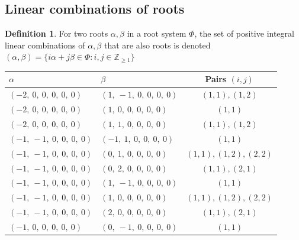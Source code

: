 \documentclass[11pt]{article}
\theoremstyle{definition}
\newtheorem{definition}{Definition}[section]
\begin{document}
\subsection{Linear combinations of roots}

\begin{definition}
For two roots $\alpha, \beta$ in a root system $\Phi$, the set of positive integral linear combinations of $\alpha, \beta$ that are also roots is denoted
\(
	(\alpha, \beta) = \{ i \alpha + j \beta \in \Phi : i, j \in \mathbb{Z}_{\ge 1} \}
\)
\end{definition}

\begin{center}
\begin{tabular}{|l|l|c|}
    \hline
    $\alpha$ & $\beta$ & Pairs $(i,j)$ \\
    \hline
    $\left( -2, \  0, \  0, \  0, \  0, \  0\right)$ & $\left( 1, \  -1, \  0, \  0, \  0, \  0\right)$ & $(1,1), (1,2)$ \\
    \hline
    $\left( -2, \  0, \  0, \  0, \  0, \  0\right)$ & $\left( 1, \  0, \  0, \  0, \  0, \  0\right)$ & $(1,1)$ \\
    \hline
    $\left( -2, \  0, \  0, \  0, \  0, \  0\right)$ & $\left( 1, \  1, \  0, \  0, \  0, \  0\right)$ & $(1,1), (1,2)$ \\
    \hline
    $\left( -1, \  -1, \  0, \  0, \  0, \  0\right)$ & $\left( -1, \  1, \  0, \  0, \  0, \  0\right)$ & $(1,1)$ \\
    \hline
    $\left( -1, \  -1, \  0, \  0, \  0, \  0\right)$ & $\left( 0, \  1, \  0, \  0, \  0, \  0\right)$ & $(1,1), (1,2), (2,2)$ \\
    \hline
    $\left( -1, \  -1, \  0, \  0, \  0, \  0\right)$ & $\left( 0, \  2, \  0, \  0, \  0, \  0\right)$ & $(1,1), (2,1)$ \\
    \hline
    $\left( -1, \  -1, \  0, \  0, \  0, \  0\right)$ & $\left( 1, \  -1, \  0, \  0, \  0, \  0\right)$ & $(1,1)$ \\
    \hline
    $\left( -1, \  -1, \  0, \  0, \  0, \  0\right)$ & $\left( 1, \  0, \  0, \  0, \  0, \  0\right)$ & $(1,1), (1,2), (2,2)$ \\
    \hline
    $\left( -1, \  -1, \  0, \  0, \  0, \  0\right)$ & $\left( 2, \  0, \  0, \  0, \  0, \  0\right)$ & $(1,1), (2,1)$ \\
    \hline
    $\left( -1, \  0, \  0, \  0, \  0, \  0\right)$ & $\left( 0, \  -1, \  0, \  0, \  0, \  0\right)$ & $(1,1)$ \\
    \hline

\end{tabular}
\end{center}
\end{document}
